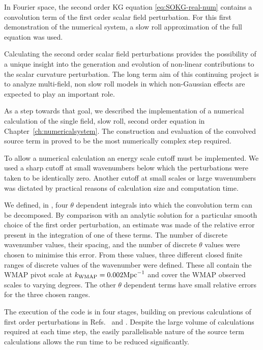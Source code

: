 In Fourier space, the second order KG equation \eqref{eq:SOKG-real-num} contains a
convolution term of the first order scalar field perturbation. For this first
demonstration of the numerical system, a slow roll approximation of the full
equation was used. 

Calculating the second order scalar field perturbations provides the possibility of
a unique insight into the generation and evolution of non-linear contributions to
the scalar curvature perturbation. The long term aim of this continuing project is
to analyze multi-field, non slow roll models in which non-Gaussian effects are
expected to play an important role.

As a step towards that goal, we described the implementation of a numerical
calculation of the single field, slow roll, second order equation in
Chapter~\ref{ch:numericalsystem}. The construction and evaluation of the convolved
source term in  proved to be the most numerically complex
step required. 

To allow a numerical calculation an energy scale cutoff must be implemented. We used
a sharp cutoff at small wavenumbers below which the perturbations were taken to be
identically zero. Another cutoff at small scales or large wavenumbers was dictated
by practical reasons of calculation size and computation time.

We defined, in , four $\theta$ dependent integrals
into which the convolution term can be decomposed. By comparison with an analytic
solution for a particular smooth choice of the first order perturbation, an estimate
was made of the relative error present in the integration of one of these terms. The
number of discrete wavenumber values, their spacing, and the number of discrete
$\theta$ values were chosen to minimise this error. From these values, three
different closed finite ranges of discrete values of the wavenumber were defined.
These all contain the WMAP pivot scale at $k_\mathrm{WMAP}=0.002\mathrm{Mpc}^{-1}$ and cover the
WMAP observed scales to varying degrees.
% 
The other $\theta$ dependent terms have small relative errors for the three chosen
ranges. 



The execution of the code is in four stages, building on previous calculations of
first order perturbations in Refs.~\cite{Martin:2006rs, Ringeval:2007am} and
\cite{Salopek:1988qh}. Despite the large volume of calculations required at each
time step, the easily parallelisable nature of the source term calculations allows
the run time to be reduced significantly.



